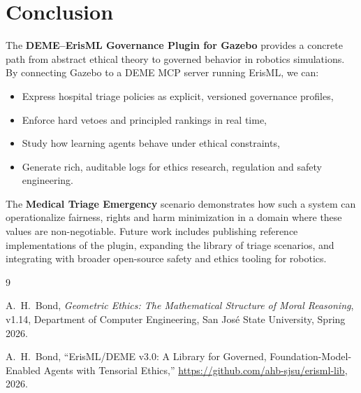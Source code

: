 \documentclass[11pt]{article}
\begin{document}
\section{Conclusion}

The \textbf{DEME--ErisML Governance Plugin for Gazebo} provides a concrete path from abstract ethical theory to governed behavior in robotics simulations. By connecting Gazebo to a DEME MCP server running ErisML, we can:

\begin{itemize}
  \item Express hospital triage policies as explicit, versioned governance profiles,
  \item Enforce hard vetoes and principled rankings in real time,
  \item Study how learning agents behave under ethical constraints,
  \item Generate rich, auditable logs for ethics research, regulation and safety engineering.
\end{itemize}

The \textbf{Medical Triage Emergency} scenario demonstrates how such a system can operationalize fairness, rights and harm minimization in a domain where these values are non-negotiable. Future work includes publishing reference implementations of the plugin, expanding the library of triage scenarios, and integrating with broader open-source safety and ethics tooling for robotics.

\begin{thebibliography}{9}

A.~H.~Bond, \emph{Geometric Ethics: The Mathematical Structure of Moral Reasoning}, v1.14, Department of Computer Engineering, San Jos\'e State University, Spring 2026.

A.~H.~Bond, ``ErisML/DEME v3.0: A Library for Governed, Foundation-Model-Enabled Agents with Tensorial Ethics,'' \url{https://github.com/ahb-sjsu/erisml-lib}, 2026.

\end{thebibliography}
\end{document}

